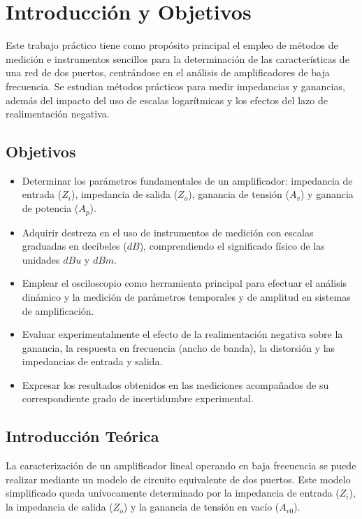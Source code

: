 \chapter{Introducción y Objetivos}
\label{chap:introduccion}

Este trabajo práctico tiene como propósito principal el empleo de métodos de medición e instrumentos
sencillos para la determinación de las características de una red de dos puertos, centrándose en el análisis
de amplificadores de baja frecuencia. Se estudian métodos prácticos para medir impedancias y ganancias,
además del impacto del uso de escalas logarítmicas y los efectos del lazo de realimentación negativa.

\section{Objetivos}
\begin{itemize}
    \item Determinar los parámetros fundamentales de un amplificador: impedancia de entrada ($Z_i$),
          impedancia de salida ($Z_o$), ganancia de tensión ($A_v$) y ganancia de potencia ($A_p$).
    \item Adquirir destreza en el uso de instrumentos de medición con escalas graduadas en decibeles ($dB$),
          comprendiendo el significado físico de las unidades $dBu$ y $dBm$.
    \item Emplear el osciloscopio como herramienta principal para efectuar el análisis dinámico y la
          medición de parámetros temporales y de amplitud en sistemas de amplificación.
    \item Evaluar experimentalmente el efecto de la realimentación negativa sobre la ganancia, la respuesta
          en frecuencia (ancho de banda), la distorsión y las impedancias de entrada y salida.
    \item Expresar los resultados obtenidos en las mediciones acompañados de su correspondiente grado de
          incertidumbre experimental.
\end{itemize}

\section{Introducción Teórica}

La caracterización de un amplificador lineal operando en baja frecuencia se puede realizar mediante un modelo
de circuito equivalente de dos puertos. Este modelo simplificado queda unívocamente determinado por la
impedancia de entrada ($Z_i$), la impedancia de salida ($Z_o$) y la ganancia de tensión en vacío ($A_{v0}$).

